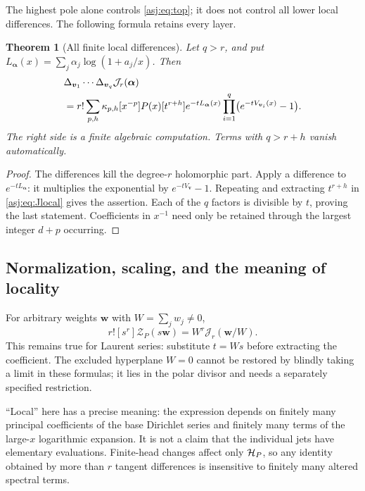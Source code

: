\documentclass[11pt]{article}
\numberwithin{equation}{section}
\newtheorem{theorem}{Theorem}[section]
\theoremstyle{definition}\newtheorem{definition}[theorem]{Definition}
\theoremstyle{remark}\newtheorem{remark}[theorem]{Remark}\newtheorem{example}[theorem]{Example}
\newcommand{\calJ}{\mathcal J}\newcommand{\calZ}{\mathcal Z}
\begin{document}
The highest pole alone controls \eqref{asj:eq:top}; it does not control
all lower local differences. The following formula retains every layer.

\begin{theorem}[All finite local differences]\label{asj:thm:all-differences}
Let $q>r$, and put $L_{\boldsymbol\alpha}(x)=
\sum_j\alpha_j\log(1+a_j/x)$. Then
\begin{align}\label{asj:eq:all-differences}
 &\Delta_{\boldsymbol v_1}\cdots\Delta_{\boldsymbol v_q}
       \calJ_r(\boldsymbol\alpha)\notag\\
 &=r!\sum_{p,h}\kappa_{p,h}[x^{-p}]P(x)
      [t^{r+h}]e^{-tL_{\boldsymbol\alpha}(x)}
            \prod_{i=1}^q\bigl(e^{-tV_{\boldsymbol v_i}(x)}-1\bigr).
\end{align}
The right side is a finite algebraic computation. Terms with $q>r+h$
vanish automatically.
\end{theorem}
\begin{proof}
The differences kill the degree-$r$ holomorphic part. Apply a difference
to $e^{-tL_{\boldsymbol\alpha}}$: it multiplies the exponential by
$e^{-tV_{\boldsymbol v}}-1$. Repeating and extracting $t^{r+h}$ in
\eqref{asj:eq:Jlocal} gives the assertion. Each of the $q$ factors is
divisible by $t$, proving the last statement. Coefficients in $x^{-1}$
need only be retained through the largest integer $d+p$ occurring.
\end{proof}

\subsection{Normalization, scaling, and the meaning of locality}
For arbitrary weights $\boldsymbol w$ with $W=\sum_jw_j\ne0$,
\begin{equation}\label{asj:eq:scaling}
 r![s^r]\calZ_P(s\boldsymbol w)
   =W^r\calJ_r(\boldsymbol w/W).
\end{equation}
This remains true for Laurent series: substitute $t=Ws$ before extracting
the coefficient. The excluded hyperplane $W=0$ cannot be restored by
blindly taking a limit in these formulas; it lies in the polar divisor
and needs a separately specified restriction.

``Local'' here has a precise meaning: the expression depends on finitely
many principal coefficients of the base Dirichlet series and finitely many
terms of the large-$x$ logarithmic expansion. It is not a claim that the
individual jets have elementary evaluations. Finite-head changes affect
only $\mathcal H_P$, so any identity obtained by more than $r$ tangent differences
is insensitive to finitely many altered spectral terms.
\end{document}
